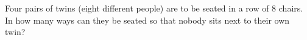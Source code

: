Four pairs of twins (eight different people) are to be seated in a row of $8$ chairs. In how many ways can they be seated so that nobody sits next to their own twin?
